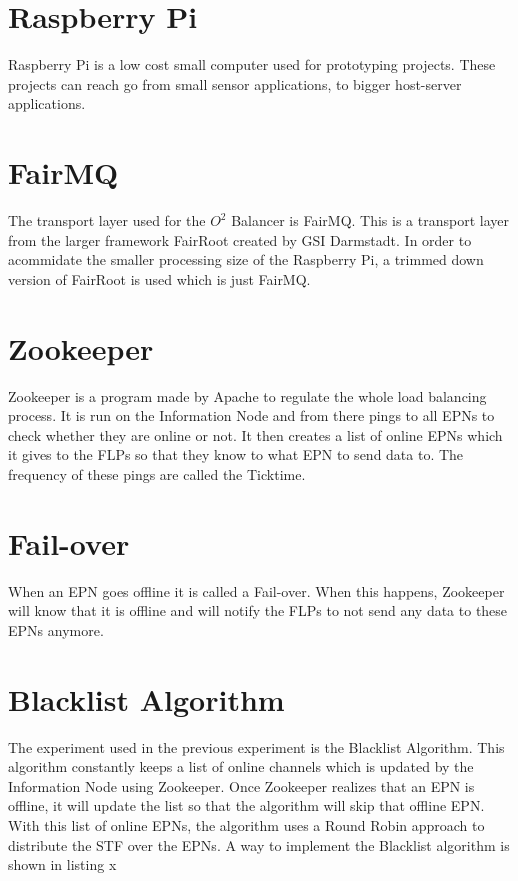 \documentclass{report}
\begin{document}
\section{Raspberry Pi}
Raspberry Pi is a  low cost small computer used for prototyping projects. These projects can reach go from small sensor applications, to bigger host-server applications.

\section{FairMQ}
The transport layer used for the $O^2$ Balancer is FairMQ. This is a transport layer from the larger framework FairRoot created by GSI Darmstadt. In order to acommidate the smaller processing size of the Raspberry Pi, a trimmed down version of FairRoot is used which is just FairMQ.

\section{Zookeeper}
Zookeeper is a program made by Apache to regulate the whole load balancing process. It is run on the Information Node and from there pings to all EPNs to check whether they are online or not. It then creates a list of online EPNs which it gives to the FLPs so that they know to what EPN to send data to. The frequency of these pings are called the Ticktime.

\section{Fail-over}
When an EPN goes offline it is called a Fail-over. When this happens, Zookeeper will know that it is offline and will notify the FLPs to not send any data to these EPNs anymore.

\section{Blacklist Algorithm}
The experiment used in the previous experiment is the Blacklist Algorithm. This algorithm constantly keeps a list of online channels which is updated by the Information Node using Zookeeper. Once Zookeeper realizes that an EPN is offline, it will update the list so that the algorithm will skip that offline EPN. With this list of online EPNs, the algorithm uses a Round Robin approach to distribute the STF over the EPNs. A way to implement the Blacklist algorithm is shown in listing x
\end{document}
